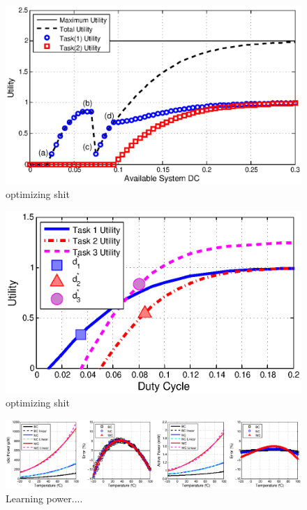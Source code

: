 \begin{figure}
\centering
\includegraphics[width=1\columnwidth]{figures/optimalDCexample.eps}
\caption{\label{fig:optimaldc_mult}optimizing shit}
\end{figure}

\begin{figure}
\centering
\includegraphics[width=1\columnwidth]{figures/utilanddc.eps}
\caption{\label{fig:utilanddc}optimizing shit}
\end{figure}

\begin{figure}
\centering
\includegraphics[width=1\textwidth]{figures/powerlearning.eps}
\caption{\label{fig:powerlearning}Learning power....}
\end{figure}


